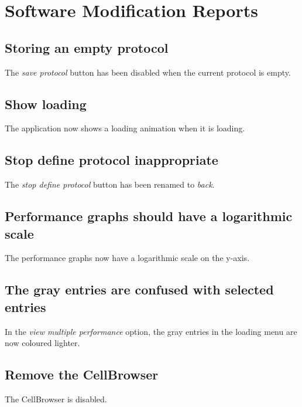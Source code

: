 \chapter{Software Modification Reports}
\label{chap:implemented}

\section*{Storing an empty protocol}
The \emph{save protocol} button has been disabled when the current protocol is empty.

\section*{Show loading}
The application now shows a loading animation when it is loading.

\section*{Stop define protocol inappropriate}
The \emph{stop define protocol} button has been renamed to \emph{back}.

\section*{Performance graphs should have a logarithmic scale}
The performance graphs now have a logarithmic scale on the y-axis.

\section*{The gray entries are confused with selected entries}
In the \emph{view multiple performance} option, the gray entries in the loading menu are now coloured lighter.

\section*{Remove the CellBrowser}
The CellBrowser is disabled.